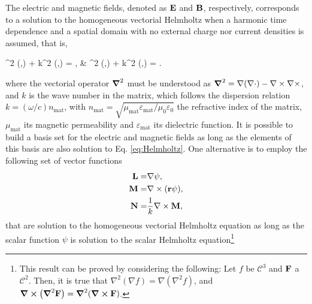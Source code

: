 
The electric and magnetic fields, denoted as $\vb{E}$ and $\vb{B}$, respectively, corresponds to a solution to the homogeneous vectorial Helmholtz when a harmonic time dependence and a spatial domain with no external charge nor current densities is assumed, that is,
%
\begin{tcolorbox}[title = Vectorial Helmholtz Equation,	ams align, breakable]
	\grad^2 (,\omega) + k^2 (,\omega) = ,
		\qquad&\qquad
  	\grad^2 (,\omega) + k^2 (,\omega) = .
  	\label{eq:Helmholtz}
\end{tcolorbox}
%
\noindent where the vectorial operator $\grad^2$ must be understood as $\grad^2 = \nabla(\nabla\cdot) - \nabla\times\nabla\times $, and $k$ is the wave number in the matrix, which follows the dispersion relation $k = (\omega/c) n_\text{mat}$, with $n_\text{mat}=\sqrt{\mu_\text{mat}\varepsilon_\text{mat} /\mu_0\varepsilon_0}$ the refractive index of the matrix, $\mu_\text{mat}$ its magnetic permeability and $\varepsilon_\text{mat}$ its dielectric function. It is possible to build a basis set for the electric and magnetic fields as long as the elements of this basis are also solution to Eq. \eqref{eq:Helmholtz}. One alternative is to employ the following set of vector functions \cite{stratton_electromagnetic_2012}
%
\begin{subequations}
\begin{align}
	\vb{L} =& \nabla \psi,
	\label{eq:L}\\
	\vb{M} =& \nabla\times(\vb{r}\psi),
	\label{eq:M}\\
	\vb{N} =&  \frac{1}{k}\nabla\times\vb{M},
	\label{eq:N}
\end{align}%
\label{eq:VSH}%
\end{subequations}
%
that are solution to the homogeneous vectorial Helmholtz equation as long as the scalar function $\psi$ is solution to the scalar Helmholtz equation\footnote{%
	This result can be proved by considering the following: Let $f$ be $\mathcal{C}^3$ and $\vb{F}$ a $\mathcal{C}^2$. Then, it is true that $\nabla^2(\nabla f) = \nabla(\nabla^2 f)$, and $\curl(\grad^2\vb{F}) = \grad^2(\curl\vb{F})$. }%
%
